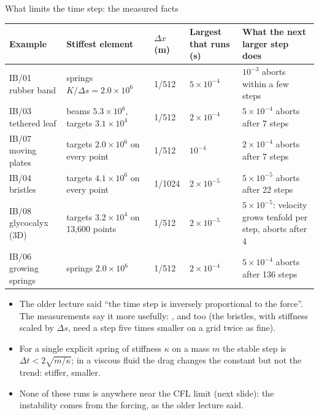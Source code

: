 \documentclass[aspectratio=169,11pt]{beamer}
\begin{document}
\begin{frame}{What limits the time step: the measured facts}
\scriptsize
\begin{tabular}{@{}L{0.15\textwidth}L{0.28\textwidth}L{0.09\textwidth}L{0.12\textwidth}L{0.23\textwidth}@{}}
\toprule
Example & Stiffest element & $\Delta x$ (m) & Largest  that runs (s) & What the next larger step does\\
\midrule
IB/01 rubber band & springs $K/\Delta s = 2.0\times10^6$ & 1/512 & $5\times10^{-4}$ & $10^{-3}$ aborts within a few steps\\
IB/03 tethered leaf & beams $5.3\times10^6$, targets $3.1\times10^4$ & 1/512 & $2\times10^{-4}$ & $5\times10^{-4}$ aborts after 7 steps\\
IB/07 moving plates & targets $2.0\times10^6$ on every point & 1/512 & $10^{-4}$ & $2\times10^{-4}$ aborts after 7 steps\\
IB/04 bristles & targets $4.1\times10^6$ on every point & 1/1024 & $2\times10^{-5}$ & $5\times10^{-5}$ aborts after 22 steps\\
IB/08 glycocalyx (3D) & targets $3.2\times10^4$ on 13,600 points & 1/512 & $2\times10^{-5}$ & $5\times10^{-5}$: velocity grows tenfold per step, aborts after 4\\
IB/06 growing springs & springs $2.0\times10^6$ & 1/512 & $2\times10^{-4}$ & $5\times10^{-4}$ aborts after 136 steps\\
\bottomrule
\end{tabular}
\vspace{2mm}
\begin{itemize}
  \item The older lecture said ``the time step is inversely proportional to the force''. The measurements say it more usefully: , and  too (the bristles, with stiffness scaled by $\Delta s$, need a step five times smaller on a grid twice as fine).
  \item For a single explicit spring of stiffness $\kappa$ on a mass $m$ the stable step is $\Delta t < 2\sqrt{m/\kappa}$; in a viscous fluid the drag changes the constant but not the trend: stiffer, smaller.
  \item None of these runs is anywhere near the CFL limit (next slide): the instability comes from the forcing, as the older lecture said.
\end{itemize}
\end{frame}
\end{document}
